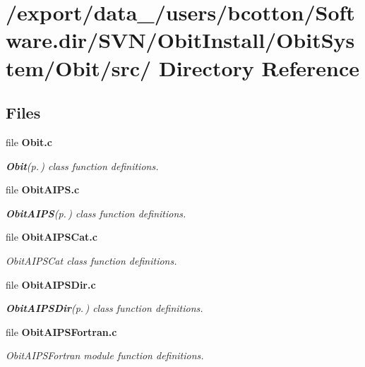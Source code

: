 \section{/export/data\_/users/bcotton/Software.dir/SVN/Obit\-Install/Obit\-System/Obit/src/ Directory Reference}
\label{dir_000000}
\subsection*{Files}
\begin{CompactItemize}
\item 
file {\bf Obit.c}
\begin{CompactList}\small\item\em {\bf Obit}{\rm (p.\,\pageref{structObit})} class function definitions. \item\end{CompactList}

\item 
file {\bf Obit\-AIPS.c}
\begin{CompactList}\small\item\em {\bf Obit\-AIPS}{\rm (p.\,\pageref{structObitAIPS})} class function definitions. \item\end{CompactList}

\item 
file {\bf Obit\-AIPSCat.c}
\begin{CompactList}\small\item\em Obit\-AIPSCat class function definitions. \item\end{CompactList}

\item 
file {\bf Obit\-AIPSDir.c}
\begin{CompactList}\small\item\em {\bf Obit\-AIPSDir}{\rm (p.\,\pageref{structObitAIPSDir})} class function definitions. \item\end{CompactList}

\item 
file {\bf Obit\-AIPSFortran.c}
\begin{CompactList}\small\item\em Obit\-AIPSFortran module function definitions. \item\end{CompactList}


\end{CompactItemize}
